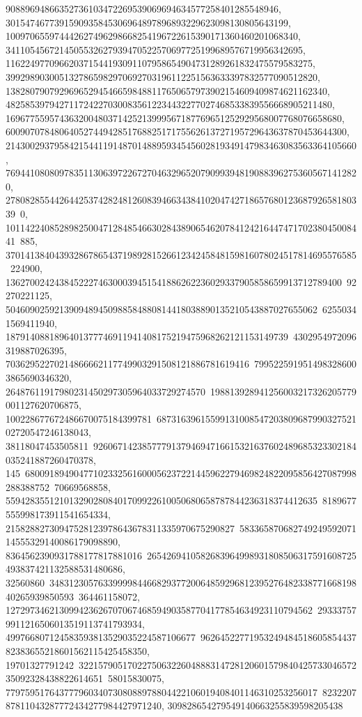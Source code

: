 {{{   90889694866352736103472269539069694634577258401285548946, 
   3015474677391590935845306964897896893229623098130805643199, 
   100970655974442627496298668254196722615390171360460201068340, 
   3411054567214505532627939470522570697725199689576719956342695, 
   116224977096620371544193091107958654904731289261832475579583275, 
   3992989030051327865982970692703196112251563633397832577090512820, 
   138280790792969652945466598488117650657973902154609409874621162340, 
   4825853979427117242270300835612234432277027468533839556668905211480, 
   169677559574363200480371425213999567187769651252929568007768076658680, 
   6009070784806405274494285176882517175562613727195729643637870453644300, 
   214300293795842154411914870148895934545602819349147983463083563364105660, 
   7694410808097835113063972267270463296520790993948190883962753605671412820, 
   27808285544264425374282481260839466343841020474271865768012368792658180339\
0, 
   10114224085289825004712848546630284389065462078412421644747170238045008441\
885, 370141384043932867865437198928152661234245848159816078024517814695576585\
224900, 136270024243845222746300039451541886262236029337905858659913712789400\
92270221125, 5046090259213909489450988584880814418038890135210543887027655062\
62550341569411940, 1879140881896401377746911941408175219475968262121153149739\
4302954972096319887026395, 70362952270214866662117749903291508121886781619416\
7995225919514983286003865690346320, 26487611917980231450297305964033729274570\
198813928941256003217326205779001127620706875, 100228677672486670075184399781\
6873163961559913100854720380968799032752102720547246138043, 38118047453505811\
926067142385777913794694716615321637602489685323302184035241887260470378, 145\
68009189490477102332561600056237221445962279469824822095856427087998288388752\
70669568858, 5594283551210132902808401709922610050680658787844236318374412635\
8189677555998173911541654334, 21582882730947528123978643678311335970675290827\
58336587068274924959207114555329140086179098890, 8364562390931788177817881016\
2654269410582683964998931808506317591608725493837421132588531480686, 32560860\
34831230576339999844668293772006485929681239527648233877166819840265939850593\
364461158072, 127297346213099423626707067468594903587704177854634923110794562\
293337579911216506013519113741793934, 499766807124583593813529035224587106677\
9626452277195324948451860585443782383655218601562115425458350, 19701327791242\
32215790517022750632260488831472812060157984042573304657235092328438822614651\
58015830075, 7797595176437779603407308088978804422106019408401146310253256017\
823220787811043287772434277984427971240, 309828654279549140663255839598205438\
}}}
